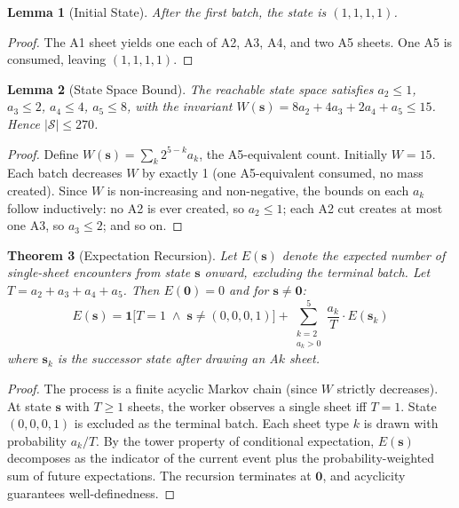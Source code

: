 \documentclass[12pt]{article}
\newtheorem{theorem}{Theorem}
\newtheorem{lemma}[theorem]{Lemma}
\begin{document}
\begin{lemma}[Initial State]
After the first batch, the state is $(1, 1, 1, 1)$.
\end{lemma}

\begin{proof}
The A1 sheet yields one each of A2, A3, A4, and two A5 sheets. One A5 is consumed, leaving $(1,1,1,1)$.
\end{proof}

\begin{lemma}[State Space Bound]
\label{lem:bound}
The reachable state space satisfies $a_2 \le 1$, $a_3 \le 2$, $a_4 \le 4$, $a_5 \le 8$, with the invariant $W(\mathbf{s}) = 8a_2 + 4a_3 + 2a_4 + a_5 \le 15$. Hence $|\mathcal{S}| \le 270$.
\end{lemma}

\begin{proof}
Define $W(\mathbf{s}) = \sum_k 2^{5-k} a_k$, the A5-equivalent count. Initially $W = 15$. Each batch decreases $W$ by exactly 1 (one A5-equivalent consumed, no mass created). Since $W$ is non-increasing and non-negative, the bounds on each $a_k$ follow inductively: no A2 is ever created, so $a_2 \le 1$; each A2 cut creates at most one A3, so $a_3 \le 2$; and so on.
\end{proof}

\begin{theorem}[Expectation Recursion]
\label{thm:recursion}
Let $E(\mathbf{s})$ denote the expected number of single-sheet encounters from state $\mathbf{s}$ onward, excluding the terminal batch. Let $T = a_2 + a_3 + a_4 + a_5$. Then $E(\mathbf{0}) = 0$ and for $\mathbf{s} \neq \mathbf{0}$:
\[
E(\mathbf{s}) = \mathbf{1}\!\bigl[T = 1 \;\wedge\; \mathbf{s} \neq (0,0,0,1)\bigr] + \sum_{\substack{k=2 \\ a_k > 0}}^{5} \frac{a_k}{T} \cdot E(\mathbf{s}_k)
\]
where $\mathbf{s}_k$ is the successor state after drawing an A$k$ sheet.
\end{theorem}

\begin{proof}
The process is a finite acyclic Markov chain (since $W$ strictly decreases). At state $\mathbf{s}$ with $T \ge 1$ sheets, the worker observes a single sheet iff $T = 1$. State $(0,0,0,1)$ is excluded as the terminal batch. Each sheet type $k$ is drawn with probability $a_k/T$. By the tower property of conditional expectation, $E(\mathbf{s})$ decomposes as the indicator of the current event plus the probability-weighted sum of future expectations. The recursion terminates at $\mathbf{0}$, and acyclicity guarantees well-definedness.
\end{proof}
\end{document}
